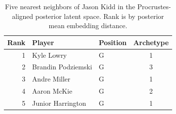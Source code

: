 \begin{table}[htbp]
  \centering\small
  \begin{tabular}{rllc}
    \toprule
    Rank & Player & Position & Archetype \\
    \midrule
    1 & Kyle Lowry & G & 1 \\
    2 & Brandin Podziemski & G & 3 \\
    3 & Andre Miller & G & 1 \\
    4 & Aaron McKie & G & 2 \\
    5 & Junior Harrington & G & 1 \\
    \bottomrule
  \end{tabular}
  \caption{Five nearest neighbors of Jason Kidd in the Procrustes-aligned posterior latent space. Rank is by posterior mean embedding distance.}
  \label{tab:Jason_Kidd_neighbors}
\end{table}


